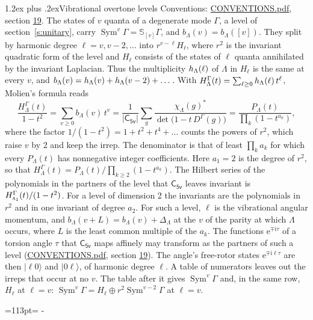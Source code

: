 \documentclass[10pt,a4paper]{article}
\makeatletter
\renewcommand\section{\@startsection{section}{1}{\z@}{-3ex plus -1ex minus -.2ex}%
  {1.2ex plus .2ex}{\normalfont\large\sffamily\bfseries\color{parttitle}}}
\newcommand{\needspace}[1]{\par\penalty-100\begingroup\dimen0=#1\relax\dimen2=\pagegoal
  \advance\dimen2-\pagetotal\ifdim\dimen0>\dimen2\relax\ifdim\dimen2>0pt\vfil\break\fi\fi
  \endgroup}
\numberwithin{equation}{section}
\newcommand{\grp}[1]{\mathsf{#1}}
\newcommand{\irr}[1]{\text{\normalfont\scshape #1}}
\newcommand{\iunit}{\mathrm{i}}
\newcommand{\expe}{\mathrm{e}}
\newcommand{\repD}[1]{D^{#1}}
\newcommand{\irchar}[1]{\chi_{#1}}
\newcommand{\conj}[1]{{#1}^{*}}
\newcommand{\schur}[1]{\mathbb{S}_{#1}}
\newcommand{\shape}[1]{[#1]}
\newcommand{\occ}[1]{\lvert #1\rangle}
\makeatother
\begin{document}
\section{Vibrational overtone levels}\label{s:overtones}
Conventions: \href{../../CONVENTIONS.pdf}{CONVENTIONS.pdf}, section \href{../../CONVENTIONS.pdf\#conv.19}{19}.
\leavevmode\label{n:index.quanta}\label{n:operator.symmetric.power}The states of $v$ quanta of a degenerate mode $\Gamma$, a level of section~\ref{s:unitary}, carry $\operatorname{Sym}^{v}\Gamma = \schur{\shape{v}}\Gamma$, and $b_\Lambda(v) = b_\Lambda(\shape{v})$. \label{n:local.quadratic.form}\label{n:set.harmonic}They split by harmonic degree $\ell = v, v - 2, \dots$ into $r^{v-\ell}H_\ell$, where $r^2$ is the invariant quadratic form of the level and $H_\ell$ consists of the states of $\ell$ quanta annihilated by the invariant Laplacian. \label{n:function.multiplicity.harmonic}Thus the multiplicity $\mathnormal{h}_\Lambda(\ell)$ of $\Lambda$ in $H_\ell$ is the same at every $v$, and $b_\Lambda(v) = \mathnormal{h}_\Lambda(v) + \mathnormal{h}_\Lambda(v - 2) + \dots$. \label{n:function.generating.level}With $H^{\Gamma}_\Lambda(t) = \sum_{\ell\ge0} \mathnormal{h}_\Lambda(\ell)\,t^{\ell}$, Molien's formula reads
\begin{equation}\label{e:molien}\frac{H^{\Gamma}_\Lambda(t)}{1 - t^2} = \sum_{v\ge0} b_\Lambda(v)\,t^v = \frac{1}{|\grp{C_{5v}}|}\sum_{g}\frac{\conj{\irchar{\Lambda}(g)}}{\det\bigl(1 - t\,\repD{\Gamma}(g)\bigr)} = \frac{P_\Lambda(t)}{\prod_k (1-t^{a_k})},\end{equation}
where the factor $1/(1 - t^2) = 1 + t^2 + t^4 + \dots$ counts the powers of $r^2$, which raise $v$ by 2 and keep the irrep. The denominator is that of least $\prod_k a_k$ for which every $P_\Lambda(t)$ has nonnegative integer coefficients. Here $a_1 = 2$ is the degree of $r^2$, so that $H^{\Gamma}_\Lambda(t) = P_\Lambda(t)/\prod_{k\ge2}(1 - t^{a_k})$. The Hilbert series of the polynomials in the partners of the level that $\grp{C_{5v}}$ leaves invariant is $H^{\Gamma}_{\irr{a}_{1}}(t)/(1 - t^2)$. For a level of dimension 2 the invariants are the polynomials in $r^2$ and in one invariant of degree $a_2$. \label{n:index.overtone.period}\label{n:index.increment.unitary}For such a level, $\ell$ is the vibrational angular momentum, and $b_\Lambda(v + L) = b_\Lambda(v) + \Delta_\Lambda$ at the $v$ of the parity at which $\Lambda$ occurs, where $L$ is the least common multiple of the $a_k$. \label{n:local.torsion.angle}The functions $\expe^{\mp\iunit\tau}$ of a torsion angle $\tau$ that $\grp{C_{5v}}$ maps affinely may transform as the partners of such a level (\href{../../CONVENTIONS.pdf}{CONVENTIONS.pdf}, section \href{../../CONVENTIONS.pdf\#conv.19}{19}). The angle's free-rotor states $\expe^{\mp\iunit\ell\tau}$ are then $\occ{\ell 0}$ and $\occ{0 \ell}$, of harmonic degree $\ell$. A table of numerators leaves out the irreps that occur at no $v$. The table after it gives $\operatorname{Sym}^{v}\Gamma$ and, in the same row, $H_\ell$ at $\ell = v$: $\operatorname{Sym}^{v}\Gamma = H_\ell \oplus r^2\operatorname{Sym}^{v-2}\Gamma$ at $\ell = v$.
\needspace{113pt}
\end{document}
